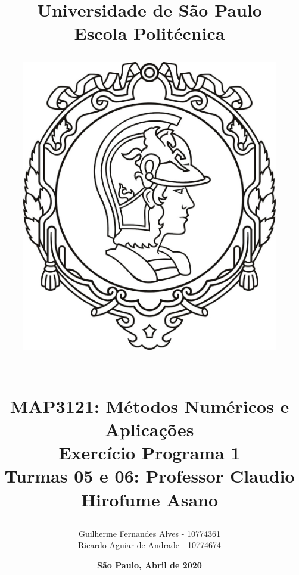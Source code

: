 \documentclass[a4paper, 12pt]{article}
\begin{document}




\title{\textbf{Universidade de São Paulo\\ Escola Politécnica}
	\vspace{15pt}
	\begin{figure}[!h]
		\centering
		\includegraphics[scale=0.15]{Poli}
	\end{figure}
	\vspace{30pt}
	\\\textbf{MAP3121: Métodos Numéricos e Aplicações} \\
	\vspace{15pt} {Exercício Programa 1}\\
	\vspace{10pt}
	\vspace{15pt} 
	\Large{Turmas 05 e 06: Professor Claudio Hirofume Asano}}


	\author{Guilherme Fernandes Alves - 10774361 \\ Ricardo Aguiar de Andrade - 10774674 \vspace{85pt}}
	\date{\textbf{\Large{São Paulo, Abril de 2020}}}
	\maketitle
\end{document}
